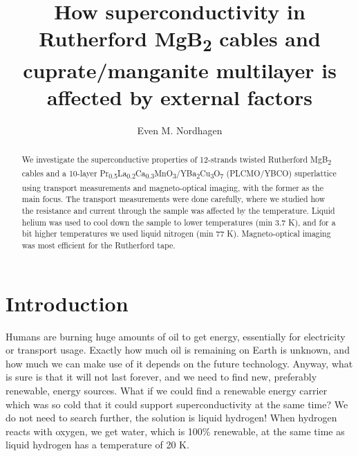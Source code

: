 \documentclass{comjnl}
\begin{document}
\title[Superconductivity in Rutherford \texorpdfstring{MgB\textsubscript{2}}{MgB2}  cables and cuprate/manganite multilayer]{How superconductivity in Rutherford \texorpdfstring{MgB\textsubscript{2}}{MgB2}  cables and cuprate/manganite multilayer is affected by external factors}
\author{Even M. Nordhagen}
 

 




\begin{abstract}
We investigate the superconductive properties of 12-strands twisted Rutherford \texorpdfstring{MgB\textsubscript{2}}{MgB2} cables and a 10-layer \texorpdfstring{Pr\textsubscript{0.5}La\textsubscript{0.2}Ca\textsubscript{0.3}MnO\textsubscript{3}/YBa\textsubscript{2}Cu\textsubscript{3}O\textsubscript{7}}{Pr0.5La0.2Ca0.3MnO3/YBa2Cu3O7} (PLCMO/YBCO) superlattice using transport measurements and magneto-optical imaging, with the former as the main focus. The transport measurements were done carefully, where we studied how the resistance and current through the sample was affected by the temperature. Liquid helium was used to cool down the sample to lower temperatures (min 3.7 K), and for a bit higher temperatures we used liquid nitrogen (min 77 K).  Magneto-optical imaging was most efficient for the Rutherford tape.
\end{abstract}

\maketitle


\section{Introduction}
Humans are burning huge amounts of oil to get energy, essentially for electricity or transport usage. Exactly how much oil is remaining on Earth is unknown, and how much we can make use of it depends on the future technology. Anyway, what is sure is that it will not last forever, and we need to find new, preferably renewable, energy sources. What if we could find a renewable energy carrier which was so cold that it could support superconductivity at the same time? We do not need to search further, the solution is liquid hydrogen! When hydrogen reacts with oxygen, we get water, which is 100\% renewable, at the same time as liquid hydrogen has a temperature of 20 K.
\end{document}
